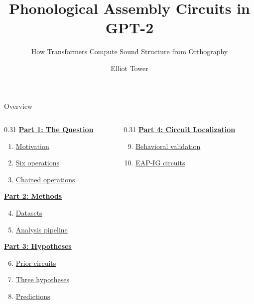 \documentclass[10pt,aspectratio=169]{beamer}
\title{Phonological Assembly Circuits in GPT-2}
\subtitle{How Transformers Compute Sound Structure from Orthography}
\author{Elliot Tower}
\date{}
\begin{document}
\begin{frame}[plain]
\maketitle
\end{frame}

\begin{frame}{Overview}
\hypertarget{sl:overview}{}

\begin{columns}[T]
\begin{column}{0.31\textwidth}
\textbf{\hyperlink{sl:motivation}{Part 1: The Question}}
\begin{enumerate}
  \item \hyperlink{sl:motivation}{Motivation}
  \item \hyperlink{sl:operations}{Six operations}
  \item \hyperlink{sl:oronym}{Chained operations}
\end{enumerate}

\vspace{0.6em}
\textbf{\hyperlink{sl:datasets}{Part 2: Methods}}
\begin{enumerate}\setcounter{enumi}{3}
  \item \hyperlink{sl:datasets}{Datasets}
  \item \hyperlink{sl:discovery}{Analysis pipeline}
\end{enumerate}

\vspace{0.6em}
\textbf{\hyperlink{sl:backbone}{Part 3: Hypotheses}}
\begin{enumerate}\setcounter{enumi}{5}
  \item \hyperlink{sl:backbone}{Prior circuits}
  \item \hyperlink{sl:fusionheads}{Three hypotheses}
  \item \hyperlink{sl:composition}{Predictions}
\end{enumerate}
\end{column}

\begin{column}{0.31\textwidth}
\textbf{\hyperlink{sl:results}{Part 4: Circuit Localization}}
\begin{enumerate}\setcounter{enumi}{8}
  \item \hyperlink{sl:behavioral}{Behavioral validation}
  \item \hyperlink{sl:eapresults}{EAP-IG circuits}
\end{enumerate}


\end{column}
\end{columns}
\end{frame}
\end{document}
